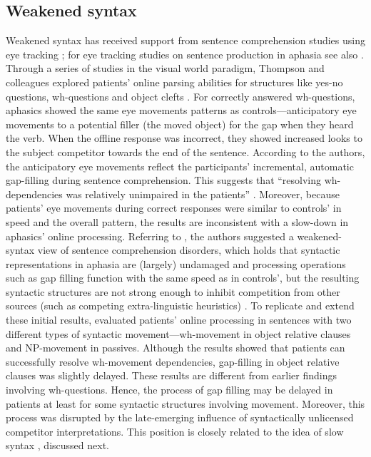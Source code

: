 \documentclass{cambridge7A}\usepackage[]{graphicx}\usepackage[]{color}
\begin{document}
\subsection{Weakened syntax}
Weakened syntax has received support from sentence comprehension studies using eye tracking \citep[e.g.,][]{Choy:2010,Dickey2009,Dickey:2007a,hanneetal11,Meyer2012,ThompsonChoy-2009}; for eye tracking studies on sentence production in aphasia see also \cite{Cho2010,Lee2011a,Lee2011}.
Through a series of studies in the visual world paradigm, Thompson and colleagues explored patients' online parsing abilities
for structures like yes-no questions, wh-questions and object clefts \cite{Dickey:2007a,Thompson2004}.
For correctly answered wh-questions, aphasics showed the same eye movements patterns as controls---anticipatory eye movements to a potential filler (the moved object) for the gap when they heard the verb. When the offline response was incorrect, they showed increased looks to the subject competitor towards the end of the sentence.
According to the authors, the anticipatory eye movements reflect the participants' incremental, automatic gap-filling during sentence comprehension. This suggests that 
``resolving wh-dependencies was relatively unimpaired in the patients'' \cite[p.~14][]{Dickey:2007a}. Moreover, because patients' eye movements during correct responses were similar to controls' in speed and the overall pattern, the results are inconsistent with a slow-down in aphasics' online processing. 
Referring to \cite{Avrutin:2006}, the authors suggested a weakened-syntax view of sentence comprehension disorders, which holds that syntactic representations in aphasia are (largely) undamaged and processing operations such as gap filling function with the same speed as in controls', but the resulting syntactic structures are not strong enough to inhibit competition from other sources (such as competing extra-linguistic heuristics) \cite{Dickey:2007a}. 
To replicate and extend these initial results, \cite{Dickey2006,Dickey2009} evaluated patients' online processing in sentences with two different types of syntactic movement---wh-movement in object relative clauses and NP-movement in passives. 
Although the results showed that patients can successfully resolve wh-movement dependencies,  gap-filling in object relative clauses was slightly delayed. 
These results are different from earlier findings involving wh-questions. 
Hence, the process of gap filling may be delayed in patients at least for some syntactic structures involving movement. Moreover, this process was disrupted by the late-emerging influence of syntactically unlicensed competitor interpretations.
This position is closely related to the idea of slow syntax \citep{BurkhardtEtAl2003}, discussed next.
\end{document}

